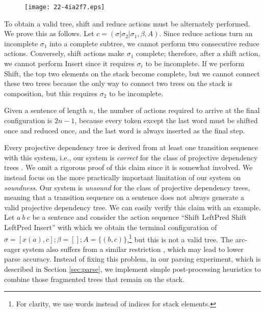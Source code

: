 \documentclass[english]{jnlp_1.4}
\begin{document}
\begin{figure}[t]
\begin{center}
\texttt{[image: 22-4ia2f7.eps]}
\end{center}
\label{fig:correspondence}
\end{figure}

To obtain a valid tree, shift and reduce actions must be alternately performed.
We prove this as follows.
Let $c=(\sigma|\sigma_2|\sigma_1,\beta,A)$.
Since reduce actions turn an incomplete $\sigma_1$ into a complete subtree, we cannot perform two consecutive reduce actions.
Conversely, shift actions make $\sigma_1$ complete;
therefore, after a shift action, we cannot perform {\sc Insert} since it requires $\sigma_i$ to be incomplete.
If we perform {\sc Shift}, the top two elements on the stack become complete, but we cannot connect these two trees because the only way to connect two trees on the stack is composition, but this requires $\sigma_2$ to be incomplete.

Given a sentence of length $n$, the number of actions required to arrive at the final configuration is $2n-1$, because every token except the last word must be shifted once and reduced once, and the last word is always inserted as the final step.

Every projective dependency tree is derived from at least one transition sequence with this system, i.e., our system is {\it correct} for the class of projective dependency trees \cite{Nivre:2008}.
We omit a rigorous proof of this claim since it is somewhat involved.
We instead focus on the more practically important limitation of our system on {\it soundness}. Our system is {\it unsound} for the class of projective dependency trees, meaning that a transition sequence on a sentence does not always generate a valid projective dependency tree.
We can easily verify this claim with an example.
Let $a~b~c$ be a sentence and consider the action sequence ``{\sc Shift LeftPred Shift LeftPred Insert}'' with which we obtain the terminal configuration of $\sigma= [ x(a), c ]; \beta=[]; A=\{ (b,c) \}$,\footnote{For clarity, we use words instead of indices for stack elements.} but this is not a valid tree.
The arc-eager system also suffers from a similar restriction \cite{NivreAEP14}, which may lead to lower parse accuracy.
Instead of fixing this problem, in our parsing experiment, which is described in Section \ref{sec:parse}, we implement simple post-processing heuristics to combine those fragmented trees that remain on the stack.
\end{document}
